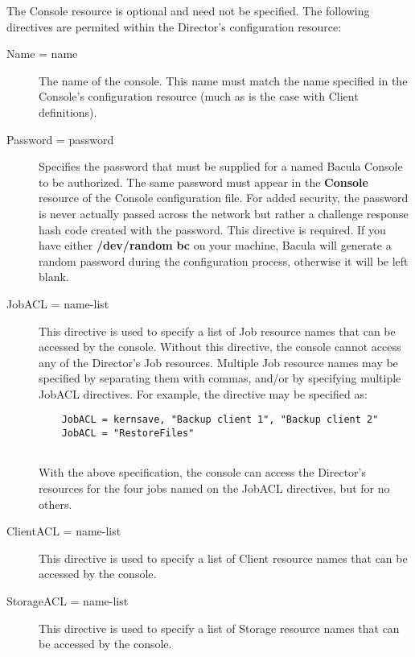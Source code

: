 The Console resource is optional and need not be specified. The following
directives are permited within the Director's configuration resource: 

\begin{description}

\item [Name = \lt{}name\gt{}]
   The name of the console. This  name must match the name specified in the
Console's configuration  resource (much as is the case with Client
definitions).  

\item [Password = \lt{}password\gt{}]
   Specifies the password that  must be supplied for a named Bacula Console to be
authorized. The same  password must appear in the {\bf Console} resource of
the Console  configuration file. For added security, the password is never 
actually passed across the network but rather a challenge response  hash code
created with the password. This directive is required.  If you have either
{\bf /dev/random}  {\bf bc} on your machine, Bacula will generate a random 
password during the configuration process, otherwise it will  be left blank. 

\item [JobACL = \lt{}name-list\gt{}]
   This directive is used to  specify a list of Job resource names that can be
accessed by  the console. Without this directive, the console cannot access 
any of the Director's Job resources. Multiple Job resource names  may be
specified by separating them with commas, and/or by specifying  multiple
JobACL directives. For example, the directive  may be specified as:  

\footnotesize
\begin{verbatim}
    JobACL = kernsave, "Backup client 1", "Backup client 2"
    JobACL = "RestoreFiles"
    
\end{verbatim}
\normalsize

With the above specification, the console can access the Director's  resources
for the four jobs named on the JobACL directives,  but for no others.  

\item [ClientACL = \lt{}name-list\gt{}]
   This directive is used to  specify a list of Client resource names that can be
accessed by  the console.  

\item [StorageACL = \lt{}name-list\gt{}]
   This directive is used to  specify a list of Storage resource names that can
be accessed by  the console.  


\end{description}
